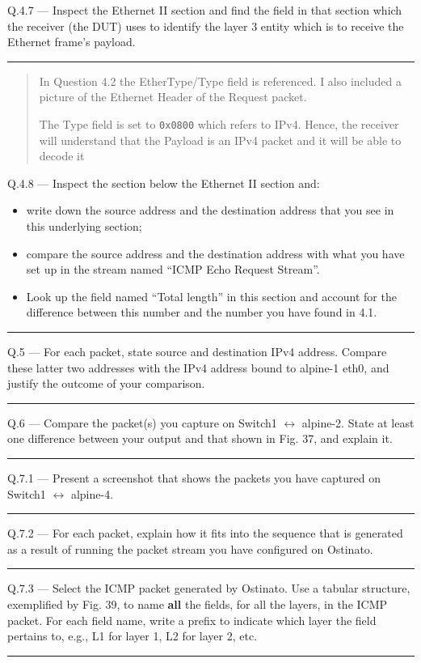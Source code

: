 \documentclass{article}
\newcommand\Que[2]{%
   \begin{samepage}
   \leavevmode\par
   \noindent
   Q.#1 --- #2\par\vspace{10pt}\hrule\vspace{10pt}
   \end{samepage}}
\newenvironment{ans}
   {\fbox{Answer}\begin{quote}\nopagebreak}
   {\end{quote}}
\begin{document}
\Que{4.7}{Inspect the Ethernet II section and find the field in
that section which the receiver (the DUT) uses to identify the
layer 3 entity which is to receive the Ethernet frame's
payload.}
\begin{ans}
	In Question 4.2 the EtherType/Type
	field is referenced. I also included a picture of the Ethernet Header of the
	Request packet.
	
	The Type field is set to \texttt{0x0800} which refers to IPv4. Hence,
	the receiver will understand that the Payload is an IPv4 packet
	and it will be able to decode it
\end{ans}

\Que{4.8}{Inspect the section below the Ethernet II section and:
\begin{itemize}
\item write down the source address and the destination address
   that you see in this underlying section;
\item compare the source address and the destination address
   with what you have set up in the stream named ``ICMP Echo
   Request Stream''.
\item Look up the field named ``Total length'' in this section
   and account for the difference between this number and the
   number you have found in 4.1.
\end{itemize}}


\Que{5}{For each packet, state source and destination IPv4
address. Compare these latter two addresses with the IPv4
address bound to alpine-1 eth0, and justify the outcome of your
comparison.}

\Que{6}{Compare the packet(s) you capture on Switch1
$\leftrightarrow$ alpine-2. State at least one difference
between your output and that shown in Fig. 37, and explain it.}


\Que{7.1}{Present a screenshot that shows the packets you have
captured on Switch1 $\leftrightarrow$ alpine-4.}


\Que{7.2}{For each packet, explain how it fits into the sequence that is generated as a result of running the
packet stream you have configured on Ostinato.}

\Que{7.3}{Select the ICMP packet generated by Ostinato. Use a
   tabular structure, exemplified by Fig. 39, to name
   \textbf{all} the fields, for all the layers, in the ICMP
   packet. For each field name, write a prefix to indicate which
layer the field pertains to, e.g., L1 for layer 1, L2 for layer
2, etc.}
\end{document}
